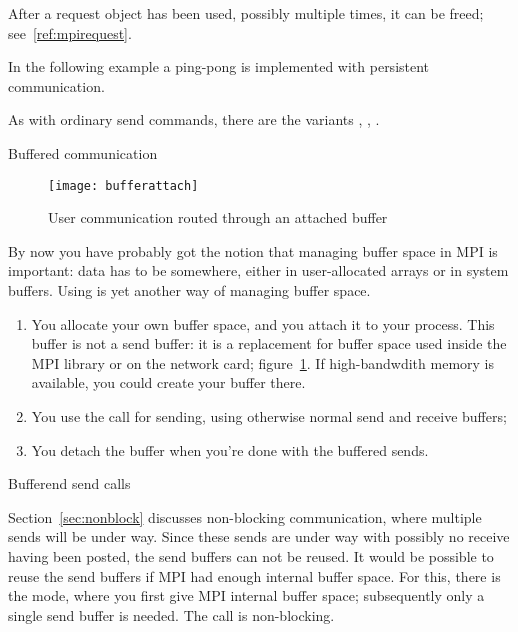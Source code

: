 After a request object has been used, possibly multiple times, it can
be freed; see~\ref{ref:mpirequest}.

In the following example a ping-pong is implemented with persistent communication.
%

As with ordinary send commands, there are the variants
,
,
.


 {Buffered communication}
\label{sec:buffered}

\begin{figure}[ht]
  \texttt{[image: bufferattach]}
  \caption{User communication routed through an attached buffer}
  \label{fig:bufattach}
\end{figure}

By now you have probably got the notion that managing buffer
space in MPI is important: data has to be somewhere, either in
user-allocated arrays or in system buffers. Using
 is yet another
way of managing buffer space.
\begin{enumerate}
\item You allocate your own buffer space, and you attach it to your
  process. This buffer is not a send buffer: it is a replacement for
  buffer space used inside the MPI library or on the network card;
  figure~\ref{fig:bufattach}. If high-bandwdith memory is available,
  you could create your buffer there.
\item You use the  call for sending, using
  otherwise normal send and receive buffers;
\item You detach the buffer when you're done with the buffered sends.
\end{enumerate}

 {Bufferend send calls}

Section~\ref{sec:nonblock} discusses non-blocking communication, where
multiple sends will be under way. Since these sends are under way with
possibly no receive having been posted, the send buffers can not be
reused. It would be possible to reuse the send buffers if MPI had
enough internal buffer space. For this, there is the
 mode, where you first give MPI internal buffer
space; subsequently only a single send buffer is needed. The
 call is non-blocking.


